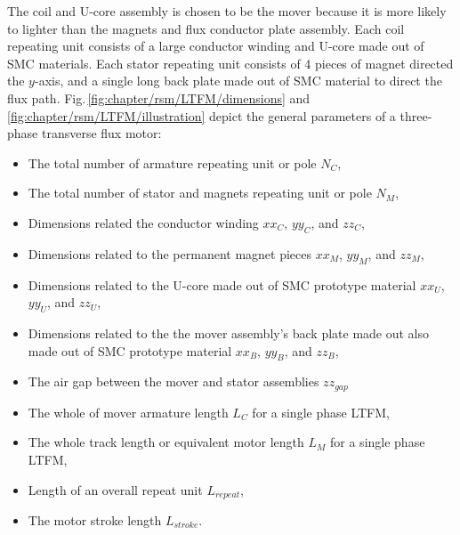         
         The coil and U-core assembly is chosen to be the mover because it is more likely to lighter than the magnets and flux conductor plate assembly. Each coil repeating unit consists of a large conductor winding and U-core made out of \acs{SMC} materials. Each stator repeating unit consists of 4 pieces of magnet directed the $y$-axis, and a single long back plate made out of \acs{SMC} material to direct the flux path. Fig.\,\ref{fig:chapter/rsm/LTFM/dimensions} and \ref{fig:chapter/rsm/LTFM/illustration} depict the general parameters of a three-phase transverse flux motor:
        
        \begin{itemize}
            \item The total number of armature repeating unit or pole $N_C$,
            \item The total number of stator and magnets repeating unit or pole $N_M$,
            \item Dimensions related the conductor winding $xx_C$, $yy_C$, and $zz_C$,
            \item Dimensions related to the permanent magnet pieces $xx_M$, $yy_M$, and $zz_M$,
            \item Dimensions related to the U-core made out of \acs{SMC} prototype material $xx_U$, $yy_U$, and $zz_U$,
            \item Dimensions related to the the mover assembly's back plate made out also made out of \acs{SMC} prototype material $xx_B$, $yy_B$, and $zz_B$,
            \item The air gap between the mover and stator assemblies  $zz_{gap}$
            \item The whole of mover armature length $L_{C}$ for a single phase \acs{LTFM},
            \item The whole track length or equivalent motor length $L_{M}$ for a single phase \acs{LTFM},
            \item Length of an overall repeat unit $L_{repeat}$,
            \item The motor stroke length $L_{stroke}$.
        \end{itemize}
        
